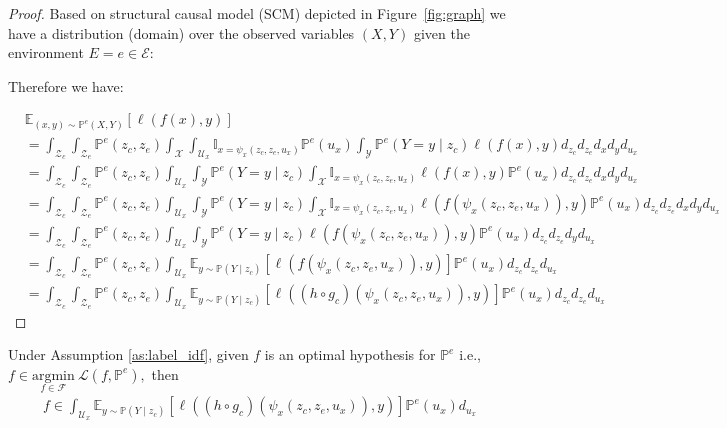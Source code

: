 \begin{proof}

Based on structural causal model (SCM) depicted in Figure~\ref{fig:graph} we have a distribution (domain) over the observed variables $(X,Y)$ given the environment $E=e \in \mathcal{E}$: 

Therefore we have:

\begin{align}
&\mathbb{E}_{(x,y)\sim\mathbb{P}^{e}(X,Y)}\left[\ell\left(f\left(x\right),y\right)\right]\nonumber\\
&= 
\int_{\mathcal{Z}_c}\int_{\mathcal{Z}_e}\mathbb{P}^{e}(z_c,z_e)\int_{\mathcal{X}}\int_{\mathcal{U}_x}\mathbb{I}_{x= \psi_x(z_c, z_e,u_x)}\mathbb{P}^{e}(u_x)\int_{\mathcal{Y}}\mathbb{P}^{e}(Y=y\mid z_c)\ell\left(f\left(x\right),y\right)  d_{z_c} d_{z_e} d_x d_y d_{u_x}\nonumber\\
&= 
\int_{\mathcal{Z}_c}\int_{\mathcal{Z}_e}\mathbb{P}^{e}(z_c,z_e)\int_{\mathcal{U}_x}\int_{\mathcal{Y}}\mathbb{P}^{e}(Y=y\mid z_c)\int_{\mathcal{X}}\mathbb{I}_{x= \psi_x(z_c, z_e,u_x)}\ell\left(f\left(x\right),y\right) \mathbb{P}^{e}(u_x) d_{z_c} d_{z_e} d_x d_y d_{u_x}\nonumber\\
&= 
\int_{\mathcal{Z}_c}\int_{\mathcal{Z}_e}\mathbb{P}^{e}(z_c,z_e)\int_{\mathcal{U}_x}\int_{\mathcal{Y}}\mathbb{P}^{e}(Y=y\mid z_c)\int_{\mathcal{X}}\mathbb{I}_{x= \psi_x(z_c, z_e,u_x)}\ell\left(f\left(\psi_x(z_c, z_e,u_x)\right),y\right) \mathbb{P}^{e}(u_x) d_{z_c} d_{z_e} d_x d_y d_{u_x}\nonumber
\\
&= 
\int_{\mathcal{Z}_c}\int_{\mathcal{Z}_e}\mathbb{P}^{e}(z_c,z_e)\int_{\mathcal{U}_x}\int_{\mathcal{Y}}\mathbb{P}^{e}(Y=y\mid z_c)\ell\left(f\left(\psi_x(z_c, z_e,u_x)\right),y\right) \mathbb{P}^{e}(u_x) d_{z_c} d_{z_e} d_y d_{u_x}\nonumber
\\
&= 
\int_{\mathcal{Z}_c}\int_{\mathcal{Z}_e}\mathbb{P}^{e}(z_c,z_e)\int_{\mathcal{U}_x}\mathbb{E}_{y\sim\mathbb{P}(Y\mid z_c)} \left[ \ell\left(f\left(\psi_x(z_c, z_e,u_x)\right),y\right)\right]
 \mathbb{P}^{e}(u_x) d_{z_c} d_{z_e}  d_{u_x}\nonumber
\\
&= 
\int_{\mathcal{Z}_c}\int_{\mathcal{Z}_e}\mathbb{P}^{e}(z_c,z_e)\int_{\mathcal{U}_x}\mathbb{E}_{y\sim\mathbb{P}(Y\mid z_c)} \left[ \ell\left((h\circ g_c)\left(\psi_x(z_c, z_e,u_x)\right),y\right)\right]
 \mathbb{P}^{e}(u_x) d_{z_c} d_{z_e}  d_{u_x}
\end{align}
\end{proof}

Under Assumption \ref{as:label_idf}, 
given \( f\) is an optimal hypothesis for $\mathbb{P}^{e}$ i.e., $ f \in \underset{f \in \mathcal{F}}{\text{argmin}} \ \mathcal{L}(f, \mathbb{P}^{e}),$ then 
\begin{align*}
f\in\int_{\mathcal{U}_x}\mathbb{E}_{y\sim\mathbb{P}(Y\mid z_c)} \left[ \ell\left((h\circ g_c)\left(\psi_x(z_c, z_e,u_x)\right),y\right)\right]
 \mathbb{P}^{e}(u_x)  d_{u_x}
\end{align*}

